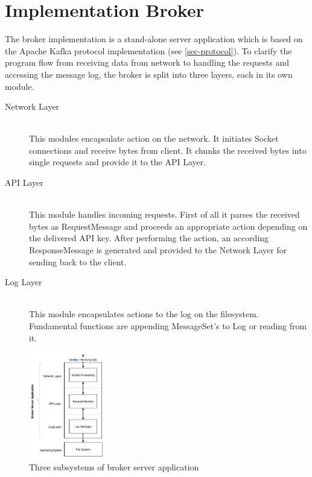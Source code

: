 \chapter{Implementation Broker}
\label{chap:broker}
The broker implementation is a stand-alone server application which is based on the
Apache Kafka protocol implementation (see \ref{sec-protocol}). To clarify the
program flow from receiving data from network to handling the requests and
accessing the message log, the broker is split into three
layers, each in its own module. 

\begin{description}
    \item [Network Layer] \hfill \\
        This modules encapsulate action on the network. It initiates Socket
        connections and receive bytes from client. It chunks the received bytes
        into single requests and provide it to the API Layer. 
    \item [API Layer] \hfill \\
        This module handles incoming requests. First of all it parses the
        received bytes as RequestMessage and proceeds an appropriate action
        depending on the delivered API key. After performing the action, an
        according ResponseMessage is generated and provided to the Network Layer
        for sending back to the client. 
    \item [Log Layer] \hfill \\
        This module encapsulates actions to the log on the filesystem.
        Fundamental functions are appending MessageSet's to Log or reading from
        it. 
\end{description}

\begin{figure}[H]
    \centering
    \includegraphics[width=0.3\textwidth]{images/impl-brok-layers.png}
    \caption{Three subsystems of broker server application}
    \label{fig:impl-brok-layers.png}
\end{figure}

